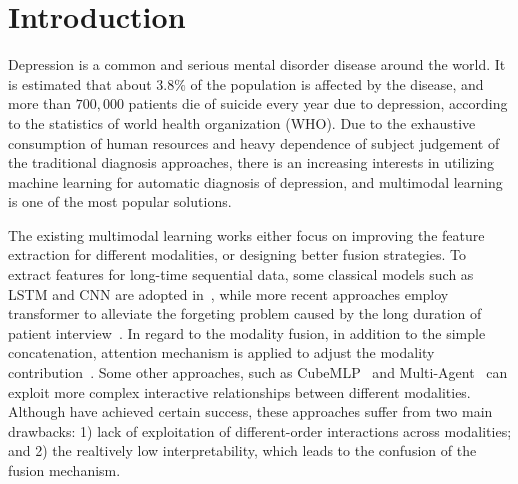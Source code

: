 \documentclass{article}
\begin{document}
\section{Introduction}
\label{sec:intro}
Depression is a common and serious mental disorder disease around the world. It is estimated that about $3.8\%$ of the population is affected by the disease, and more than $700,000$ patients die of suicide every year due to depression, according to the statistics of world health organization (WHO). Due to the exhaustive consumption of human resources and heavy dependence of subject judgement of the traditional diagnosis approaches, there is an increasing interests in utilizing machine learning for automatic diagnosis of depression, and multimodal learning is one of the most popular solutions.

The existing multimodal learning works either focus on improving the feature extraction for different modalities, or designing better fusion strategies.
To extract features for long-time sequential data,
some classical models such as LSTM and CNN are adopted in~\cite{AVEC2019,BERTCNN,MS}, while more recent approaches employ transformer to alleviate the forgeting problem caused by the long duration of patient interview~\cite{ATransformer}.
In regard to the modality fusion, in addition to the simple concatenation, attention mechanism is applied to adjust the modality contribution~\cite{DepressNet}. Some other approaches, such as CubeMLP~\cite{CubeMLP} and Multi-Agent~\cite{MultiAg} can exploit more complex interactive relationships between different modalities.
Although have achieved certain success, these approaches suffer from two main drawbacks: 1) lack of exploitation of different-order interactions across modalities;
and 2) the realtively low interpretability, which leads to the confusion of the fusion mechanism.
\end{document}
